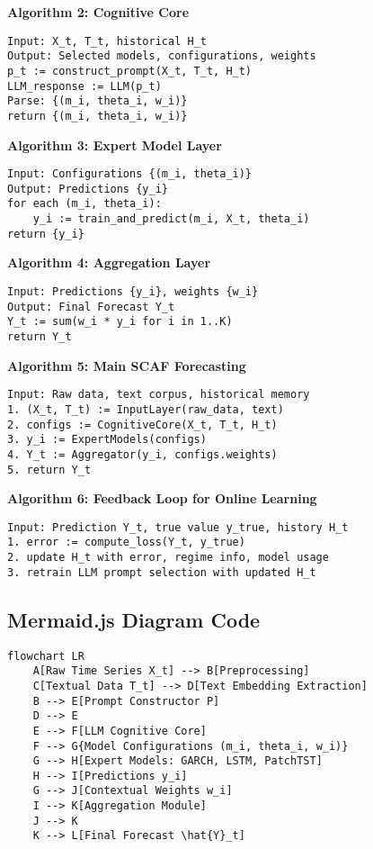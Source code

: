 \documentclass[conference]{IEEEtran}
\begin{document}
\textbf{Algorithm 2: Cognitive Core}
\begin{verbatim}
Input: X_t, T_t, historical H_t
Output: Selected models, configurations, weights
p_t := construct_prompt(X_t, T_t, H_t)
LLM_response := LLM(p_t)
Parse: {(m_i, theta_i, w_i)}
return {(m_i, theta_i, w_i)}
\end{verbatim}
\cite{yao2022react, lin2022llmfinance}

\textbf{Algorithm 3: Expert Model Layer}
\begin{verbatim}
Input: Configurations {(m_i, theta_i)}
Output: Predictions {y_i}
for each (m_i, theta_i):
    y_i := train_and_predict(m_i, X_t, theta_i)
return {y_i}
\end{verbatim}
\cite{zeng2022ltsflinear, nie2023patchtst}

\textbf{Algorithm 4: Aggregation Layer}
\begin{verbatim}
Input: Predictions {y_i}, weights {w_i}
Output: Final Forecast Y_t
Y_t := sum(w_i * y_i for i in 1..K)
return Y_t
\end{verbatim}
\cite{liu2021forecasting}

\textbf{Algorithm 5: Main SCAF Forecasting}
\begin{verbatim}
Input: Raw data, text corpus, historical memory
1. (X_t, T_t) := InputLayer(raw_data, text)
2. configs := CognitiveCore(X_t, T_t, H_t)
3. y_i := ExpertModels(configs)
4. Y_t := Aggregator(y_i, configs.weights)
5. return Y_t
\end{verbatim}

\textbf{Algorithm 6: Feedback Loop for Online Learning}
\begin{verbatim}
Input: Prediction Y_t, true value y_true, history H_t
1. error := compute_loss(Y_t, y_true)
2. update H_t with error, regime info, model usage
3. retrain LLM prompt selection with updated H_t
\end{verbatim}
\cite{wang2024deepreview}

\subsection{Mermaid.js Diagram Code}
\begin{verbatim}
flowchart LR
    A[Raw Time Series X_t] --> B[Preprocessing]
    C[Textual Data T_t] --> D[Text Embedding Extraction]
    B --> E[Prompt Constructor P]
    D --> E
    E --> F[LLM Cognitive Core]
    F --> G{Model Configurations (m_i, theta_i, w_i)}
    G --> H[Expert Models: GARCH, LSTM, PatchTST]
    H --> I[Predictions y_i]
    G --> J[Contextual Weights w_i]
    I --> K[Aggregation Module]
    J --> K
    K --> L[Final Forecast \hat{Y}_t]
\end{verbatim}
\end{document}
